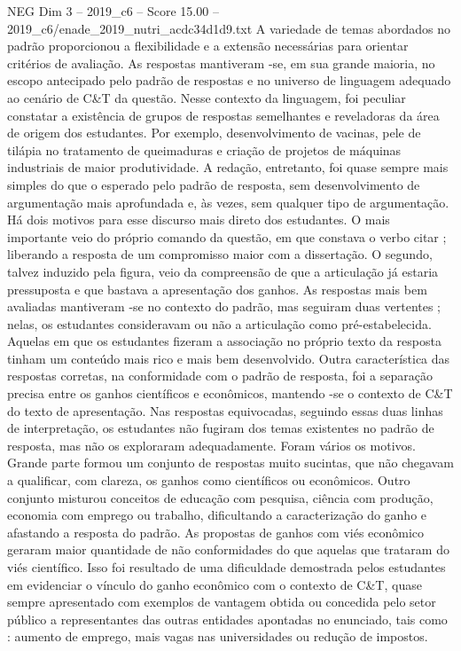 \begin{textsample}{NEG Dim 3 – 2019\_c6 – Score 15.00 – 2019\_c6/enade\_2019\_nutri\_acdc34d1d9.txt}
A variedade de temas abordados no padrão proporcionou a flexibilidade e a extensão necessárias para orientar critérios de avaliação.
As respostas mantiveram -se, em sua grande maioria, no escopo antecipado pelo padrão de respostas e no universo de linguagem adequado ao cenário de C\&T da questão.
Nesse contexto da linguagem, foi peculiar constatar a existência de grupos de respostas semelhantes e reveladoras da área de origem dos estudantes.
Por exemplo, desenvolvimento de vacinas, pele de tilápia no tratamento de queimaduras e criação de projetos de máquinas industriais de maior produtividade.
A redação, entretanto, foi quase sempre mais simples do que o esperado pelo padrão de resposta, sem desenvolvimento de argumentação mais aprofundada e, às vezes, sem qualquer tipo de argumentação.
Há dois motivos para esse discurso mais direto dos estudantes.
O mais importante veio do próprio comando da questão, em que constava o verbo citar ; liberando a resposta de um compromisso maior com a dissertação.
O segundo, talvez induzido pela figura, veio da compreensão de que a articulação já estaria pressuposta e que bastava a apresentação dos ganhos.
As respostas mais bem avaliadas mantiveram -se no contexto do padrão, mas seguiram duas vertentes ; nelas, os estudantes consideravam ou não a articulação como pré-estabelecida.
Aquelas em que os estudantes fizeram a associação no próprio texto da resposta tinham um conteúdo mais rico e mais bem desenvolvido.
Outra característica das respostas corretas, na conformidade com o padrão de resposta, foi a separação precisa entre os ganhos científicos e econômicos, mantendo -se o contexto de C\&T do texto de apresentação.
Nas respostas equivocadas, seguindo essas duas linhas de interpretação, os estudantes não fugiram dos temas existentes no padrão de resposta, mas não os exploraram adequadamente.
Foram vários os motivos.
Grande parte formou um conjunto de respostas muito sucintas, que não chegavam a qualificar, com clareza, os ganhos como científicos ou econômicos.
Outro conjunto misturou conceitos de educação com pesquisa, ciência com produção, economia com emprego ou trabalho, dificultando a caracterização do ganho e afastando a resposta do padrão.
As propostas de ganhos com viés econômico geraram maior quantidade de não conformidades do que aquelas que trataram do viés científico.
Isso foi resultado de uma dificuldade demostrada pelos estudantes em evidenciar o vínculo do ganho econômico com o contexto de C\&T, quase sempre apresentado com exemplos de vantagem obtida ou concedida pelo setor público a representantes das outras entidades apontadas no enunciado, tais como : aumento de emprego, mais vagas nas universidades ou redução de impostos.

\end{textsample}
